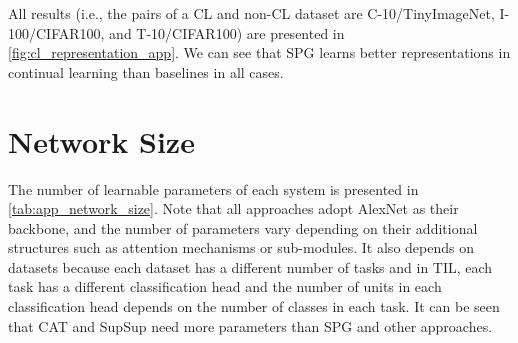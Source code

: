 All results (i.e., the pairs of a CL and non-CL dataset are C-10/TinyImageNet, I-100/CIFAR100, and T-10/CIFAR100) are presented in \cref{fig:cl_representation_app}.
We can see that SPG learns better representations in continual learning than baselines in all cases.









\section{Network Size} \label{sec:app_network_size}


The number of learnable parameters of each system is presented in \cref{tab:app_network_size}. Note that all approaches adopt AlexNet as their backbone, and the number of parameters vary depending on their additional structures such as attention mechanisms or sub-modules. It also depends on datasets because each dataset has a different number of tasks and in TIL, each task has a different classification head and the number of units in each classification head depends on the number of classes in each task.
It can be seen that CAT and SupSup need more parameters than SPG and other approaches.




